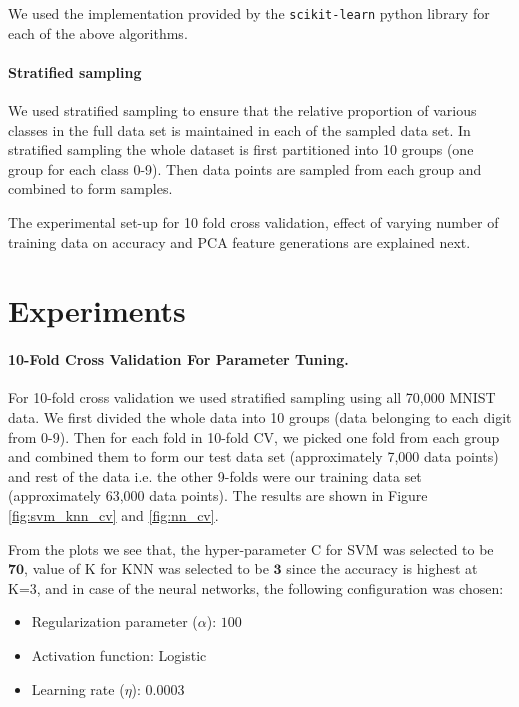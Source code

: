 \documentclass[10pt]{scrartcl}
\begin{document}
We used the implementation provided by the \texttt{scikit-learn} python library for each of the above algorithms.

\paragraph{Stratified sampling}
We used stratified sampling to ensure that the relative proportion of various classes in the full data set is maintained in each of the sampled
data set. In stratified sampling the whole dataset is first partitioned into 10 groups (one group for each class 0-9). 
Then data points are sampled from each group and combined to form samples.

The experimental set-up for 10 fold cross validation, effect of varying number of training data on accuracy and PCA feature generations are explained next.
 
\section*{Experiments} 
\paragraph{10-Fold Cross Validation For Parameter Tuning.}
For 10-fold cross validation we used stratified sampling using all 70,000 MNIST data. We first divided the whole data into 10 groups (data belonging to each digit from 0-9). Then  for each fold in 10-fold CV, we picked one fold from each group and combined them to form our test data set (approximately 7,000 data points) and rest of the data i.e. the other 9-folds were our training data set (approximately 63,000 data points). The results are shown in Figure \ref{fig:svm_knn_cv} and \ref{fig:nn_cv}.

From the plots we see that, the hyper-parameter C for SVM was selected to be $\mathbf{70}$, value of K for KNN was selected to be $\mathbf{3}$ since the accuracy is highest at K=3, and in case of the neural networks, the following configuration was chosen: 

\begin{itemize}
\item Regularization parameter ($\alpha$): $100$
\item Activation function: Logistic
\item Learning rate ($\eta$): 0.0003
\end{itemize}
\end{document}
